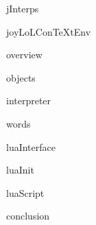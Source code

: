 
\usemodule[t-diSimp]

\startDiSimpComponent jInterps

\diSimpEnvironment joyLoLConTeXtEnv

\startJoyLoLCoAlg[title=JoyLoL interpreter][jInterps]

\diSimpComponent overview

\diSimpComponent objects

\diSimpComponent interpreter


\diSimpComponent words

\diSimpComponent luaInterface %

\diSimpComponent luaInit

\diSimpComponent luaScript

\diSimpComponent conclusion

\stopJoyLoLCoAlg

\stopDiSimpComponent

